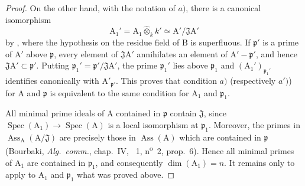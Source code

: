 \begin{proof}
On the other hand, with the notation of $a)$, there is a canonical isomorphism
\[
  \mathrm{A}_1'=\mathrm{A}_1\widehat{\otimes}_kk'
  \simeq \mathrm{A}'/\mathfrak J\mathrm{A}'
\]
by , where the hypothesis on the residue field of $\mathrm{B}$ is superfluous. If $\mathfrak p'$ is a prime of $\mathrm{A}'$ above $\mathfrak p$, every element of $\mathfrak J\mathrm{A}'$ annihilates an element of $\mathrm{A}'-\mathfrak p'$, and hence $\mathfrak J\mathrm{A}'\subset\mathfrak p'$. Putting $\mathfrak p_1'=\mathfrak p'/\mathfrak J\mathrm{A}'$, the prime $\mathfrak p_1'$ lies above $\mathfrak p_1$ and $(\mathrm{A}_1')_{\mathfrak p_1'}$ identifies canonically with $\mathrm{A}'_{\mathfrak p'}$. This proves that condition $a)$ (respectively $a')$) for $\mathrm{A}$ and $\mathfrak p$ is equivalent to the same condition for $\mathrm{A}_1$ and $\mathfrak p_1$.

All minimal prime ideals of $\mathrm{A}$ contained in $\mathfrak p$ contain $\mathfrak J$, since $\operatorname{Spec}(\mathrm{A}_1)\to\operatorname{Spec}(\mathrm{A})$ is a local isomorphism at $\mathfrak p_1$. Moreover, the primes in $\operatorname{Ass}_{\mathrm{A}}(\mathrm{A}/\mathfrak J)$ are precisely those in $\operatorname{Ass}(\mathrm{A})$ which are contained in $\mathfrak p$ (Bourbaki, \emph{Alg.\ comm.}, chap.~IV, \textsection~1, n\textsuperscript{o}~2, prop.~6). Hence all minimal primes of $\mathrm{A}_1$ are contained in $\mathfrak p_1$, and consequently $\dim(\mathrm{A}_1)=n$. It remains only to apply to $\mathrm{A}_1$ and $\mathfrak p_1$ what was proved above.
\end{proof}

